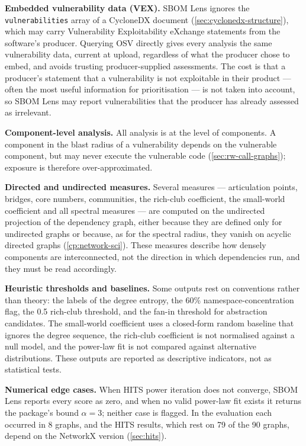 \textbf{Embedded vulnerability data (VEX).} SBOM Lens ignores the \texttt{vulnerabilities} array of a CycloneDX document (\autoref{sec:cyclonedx-structure}), which may carry Vulnerability Exploitability eXchange statements from the software's producer. Querying OSV directly gives every analysis the same vulnerability data, current at upload, regardless of what the producer chose to embed, and avoids trusting producer-supplied assessments. The cost is that a producer's statement that a vulnerability is not exploitable in their product --- often the most useful information for prioritisation --- is not taken into account, so SBOM Lens may report vulnerabilities that the producer has already assessed as irrelevant.

\textbf{Component-level analysis.} All analysis is at the level of components. A component in the blast radius of a vulnerability depends on the vulnerable component, but may never execute the vulnerable code (\autoref{sec:rw-call-graphs}); exposure is therefore over-approximated.

\textbf{Directed and undirected measures.} Several measures --- articulation points, bridges, core numbers, communities, the rich-club coefficient, the small-world coefficient and all spectral measures --- are computed on the undirected projection of the dependency graph, either because they are defined only for undirected graphs or because, as for the spectral radius, they vanish on acyclic directed graphs (\autoref{cp:network-sci}). These measures describe how densely components are interconnected, not the direction in which dependencies run, and they must be read accordingly.

\textbf{Heuristic thresholds and baselines.} Some outputs rest on conventions rather than theory: the labels of the degree entropy, the 60\% namespace-concentration flag, the 0.5 rich-club threshold, and the fan-in threshold for abstraction candidates. The small-world coefficient uses a closed-form random baseline that ignores the degree sequence, the rich-club coefficient is not normalised against a null model, and the power-law fit is not compared against alternative distributions. These outputs are reported as descriptive indicators, not as statistical tests.

\textbf{Numerical edge cases.} When HITS power iteration does not converge, SBOM Lens reports every score as zero, and when no valid power-law fit exists it returns the package's bound \(\alpha = 3\); neither case is flagged. In the evaluation each occurred in 8 graphs, and the HITS results, which rest on 79 of the 90 graphs, depend on the NetworkX version (\autoref{sec:hits}).

